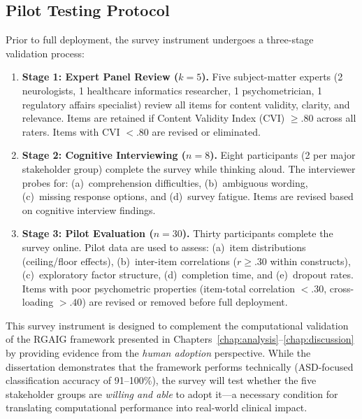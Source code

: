\subsection{Pilot Testing Protocol}
\label{subsec:survey_pilot}

Prior to full deployment, the survey instrument undergoes a three-stage validation process:

\begin{enumerate}
    \item \textbf{Stage 1: Expert Panel Review ($k = 5$).} Five subject-matter experts (2 neurologists, 1 healthcare informatics researcher, 1 psychometrician, 1 regulatory affairs specialist) review all items for content validity, clarity, and relevance. Items are retained if Content Validity Index (CVI) $\geq .80$ across all raters. Items with CVI $< .80$ are revised or eliminated.

    \item \textbf{Stage 2: Cognitive Interviewing ($n = 8$).} Eight participants (2 per major stakeholder group) complete the survey while thinking aloud. The interviewer probes for: (a)~comprehension difficulties, (b)~ambiguous wording, (c)~missing response options, and (d)~survey fatigue. Items are revised based on cognitive interview findings.

    \item \textbf{Stage 3: Pilot Evaluation ($n = 30$).} Thirty participants complete the survey online. Pilot data are used to assess: (a)~item distributions (ceiling/floor effects), (b)~inter-item correlations ($r \geq .30$ within constructs), (c)~exploratory factor structure, (d)~completion time, and (e)~dropout rates. Items with poor psychometric properties (item-total correlation $< .30$, cross-loading $> .40$) are revised or removed before full deployment.
\end{enumerate}

\noindent This survey instrument is designed to complement the computational validation of the RGAIG framework presented in Chapters~\ref{chap:analysis}--\ref{chap:discussion} by providing evidence from the \textit{human adoption} perspective. While the dissertation demonstrates that the framework performs technically (ASD-focused classification accuracy of 91--100\%), the survey will test whether the five stakeholder groups are \textit{willing and able} to adopt it---a necessary condition for translating computational performance into real-world clinical impact.

